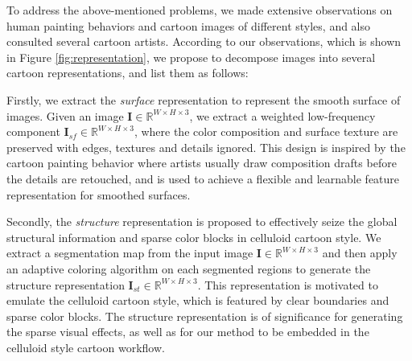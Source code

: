 \documentclass[10pt,twocolumn,letterpaper]{article}
\begin{document}
To address the above-mentioned problems, we made extensive observations on human painting behaviors and cartoon images of different styles, and also consulted several cartoon artists. According to our observations, which is shown in Figure \ref{fig:representation}, we propose to decompose images into several cartoon representations, and list them as follows:

Firstly, we extract the \emph{surface} representation to represent the smooth surface of images. Given an image $\bm{I} \in \mathbb{R}^{W \times H \times 3}$, we extract a weighted low-frequency component $\bm{I}_{sf} \in \mathbb{R}^{W \times H \times 3}$, where the color composition and surface texture are preserved with edges, textures and details ignored. This design is inspired by the cartoon painting behavior where artists usually draw composition drafts before the details are retouched, and is used to achieve a flexible and learnable feature representation for smoothed surfaces.

Secondly, the \emph{structure} representation is proposed to effectively seize the global structural information and sparse color blocks in celluloid cartoon style. We extract a segmentation map from the input image $\bm{I} \in \mathbb{R}^{W \times H \times 3}$ and then apply an adaptive coloring algorithm on each segmented regions to generate the structure representation $\bm{I}_{st} \in \mathbb{R}^{W \times H \times 3}$. This representation is motivated to emulate the celluloid cartoon style, which is featured by clear boundaries and sparse color blocks. The structure representation is of significance for generating the sparse visual effects, as well as for our method to be embedded in the celluloid style cartoon workflow.
\end{document}
